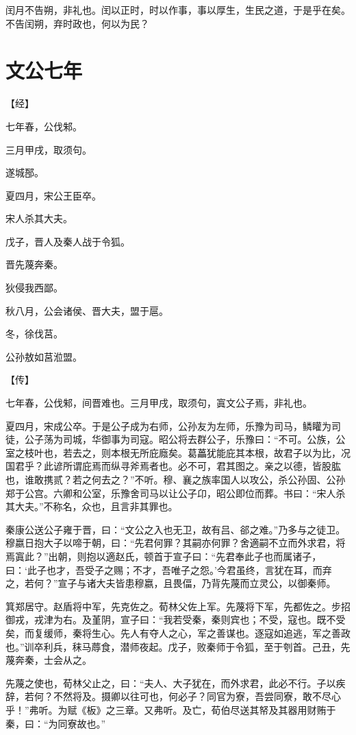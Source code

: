\documentclass[a4paper,12pt,UTF8,twoside]{ctexbook}
\begin{document}
闰月不告朔，非礼也。闰以正时，时以作事，事以厚生，生民之道，于是乎在矣。不告闰朔，弃时政也，何以为民？

\section{文公七年}


【经】

七年春，公伐邾。

三月甲戌，取须句。

遂城郚。

夏四月，宋公王臣卒。

宋人杀其大夫。

戊子，晋人及秦人战于令狐。

晋先蔑奔秦。

狄侵我西鄙。

秋八月，公会诸侯、晋大夫，盟于扈。

冬，徐伐莒。

公孙敖如莒涖盟。

【传】

七年春，公伐邾，间晋难也。三月甲戌，取须句，寘文公子焉，非礼也。

夏四月，宋成公卒。于是公子成为右师，公孙友为左师，乐豫为司马，鳞矔为司徒，公子荡为司城，华御事为司寇。昭公将去群公子，乐豫曰：“不可。公族，公室之枝叶也，若去之，则本根无所庇廕矣。葛藟犹能庇其本根，故君子以为比，况国君乎？此谚所谓庇焉而纵寻斧焉者也。必不可，君其图之。亲之以德，皆股肱也，谁敢携贰？若之何去之？”不听。穆、襄之族率国人以攻公，杀公孙固、公孙郑于公宫。六卿和公室，乐豫舍司马以让公子卬，昭公即位而葬。书曰：“宋人杀其大夫。”不称名，众也，且言非其罪也。

秦康公送公子雍于晋，曰：“文公之入也无卫，故有吕、郤之难。”乃多与之徒卫。穆嬴日抱大子以啼于朝，曰：“先君何罪？其嗣亦何罪？舍適嗣不立而外求君，将焉寘此？”出朝，则抱以適赵氏，顿首于宣子曰：“先君奉此子也而属诸子，曰：‘此子也才，吾受子之赐；不才，吾唯子之怨。’今君虽终，言犹在耳，而弃之，若何？”宣子与诸大夫皆患穆嬴，且畏偪，乃背先蔑而立灵公，以御秦师。

箕郑居守。赵盾将中军，先克佐之。荀林父佐上军。先蔑将下军，先都佐之。步招御戎，戎津为右。及堇阴，宣子曰：“我若受秦，秦则宾也；不受，寇也。既不受矣，而复缓师，秦将生心。先人有夺人之心，军之善谋也。逐寇如追逃，军之善政也。”训卒利兵，秣马蓐食，潜师夜起。戊子，败秦师于令狐，至于刳首。己丑，先蔑奔秦，士会从之。

先蔑之使也，荀林父止之，曰：“夫人、大子犹在，而外求君，此必不行。子以疾辞，若何？不然将及。摄卿以往可也，何必子？同官为寮，吾尝同寮，敢不尽心乎！”弗听。为赋《板》之三章。又弗听。及亡，荀伯尽送其帑及其器用财贿于秦，曰：“为同寮故也。”
\end{document}

